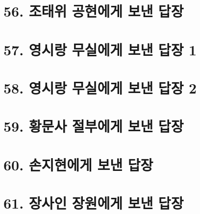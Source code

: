 \documentclass[12pt, a4paper, oneside]{book}
\let\stdsection\section
\renewcommand\section{\newpage\stdsection}
\begin{document}
%
 	\section{56. 조태위 공현에게 보낸 답장 }


%
 	\section{57. 영시랑 무실에게 보낸 답장 1 }

%
 	\section{58. 영시랑 무실에게 보낸 답장 2 }

%
 	\section{59. 황문사 절부에게 보낸 답장 }

%
 	\section{60. 손지현에게 보낸 답장 }

%
 	\section{61. 장사인 장원에게 보낸 답장 }

%
\end{document}
